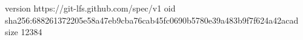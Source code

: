 version https://git-lfs.github.com/spec/v1
oid sha256:688261372205e58a47eb9cba76cab45fc0690b5780e39a483b9f7f624a42acad
size 12384
